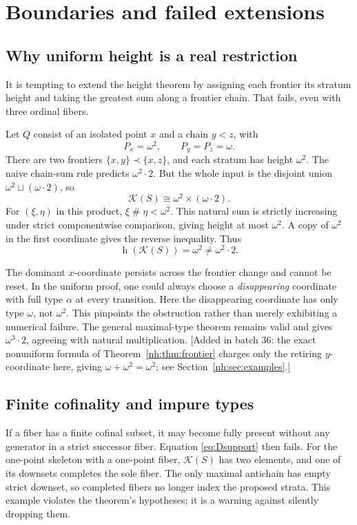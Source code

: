 \documentclass[11pt,a4paper]{article}
\theoremstyle{definition}
\theoremstyle{remark}
\newcommand{\K}{\mathcal K}
\newcommand{\hgt}{\operatorname{h}}
\newcommand{\ns}{\mathbin{\#}}
\begin{document}
\section{Boundaries and failed extensions}\label{sec:boundaries}

\subsection{Why uniform height is a real restriction}

It is tempting to extend the height theorem by assigning each frontier
its stratum height and taking the greatest sum along a frontier chain.
That fails, even with three ordinal fibers.

Let $Q$ consist of an isolated point $x$ and a chain $y<z$, with
\[
 P_x=\omega^2,\qquad P_y=P_z=\omega.
\]
There are two frontiers $\{x,y\}\prec\{x,z\}$, and each stratum has height
$\omega^2$. The naive chain-sum rule predicts $\omega^2\cdot2$.
But the whole input is the disjoint union
$\omega^2\sqcup(\omega\cdot2)$, so
\[
 \K(S)\cong\omega^2\times(\omega\cdot2).
\]
For $(\xi,\eta)$ in this product, $\xi\ns\eta<\omega^2$. This natural sum
is strictly increasing under strict componentwise comparison, giving
height at most $\omega^2$. A copy of $\omega^2$ in the first coordinate
gives the reverse inequality. Thus
\begin{equation}\label{eq:counterheight}
 \hgt(\K(S))=\omega^2\ne\omega^2\cdot2.
\end{equation}

The dominant $x$-coordinate persists across the frontier change and
cannot be reset. In the uniform proof, one could always choose a
\emph{disappearing} coordinate with full type $\alpha$ at every transition.
Here the disappearing coordinate has only type $\omega$, not $\omega^2$.
This pinpoints the obstruction rather than merely exhibiting a numerical
failure. The general maximal-type theorem remains valid and gives
$\omega^3\cdot2$, agreeing with natural multiplication.
[Added in batch 36: the exact nonuniform formula of
Theorem~\ref{nh:thm:frontier} charges only the retiring $y$-coordinate
here, giving $\omega+\omega^2=\omega^2$; see
Section~\ref{nh:sec:examples}.]

\subsection{Finite cofinality and impure types}

If a fiber has a finite cofinal subset, it may become fully present
without any generator in a strict successor fiber. Equation
\eqref{eq:Dsupport} then fails. For the one-point skeleton with a
one-point fiber, $\K(S)$ has two elements, and one of its downsets
completes the sole fiber. The only maximal antichain has empty strict
downset, so completed fibers no longer index the proposed strata. This
example violates the theorem's hypotheses; it is a warning against
silently dropping them.
\end{document}
